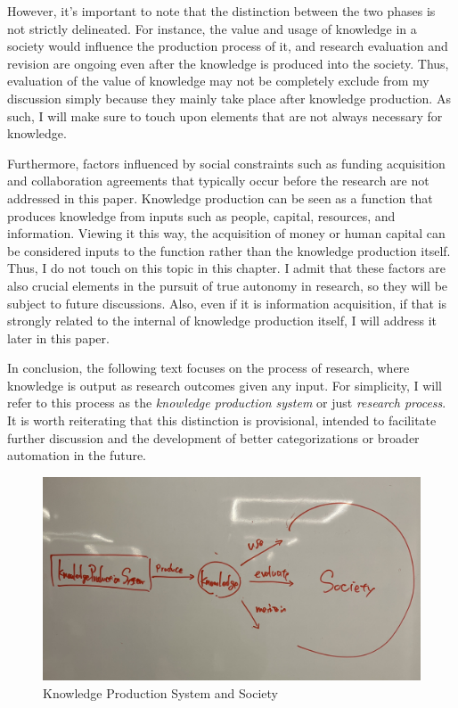 \documentclass{book}
\begin{document}
However, it's important to note that the distinction between the two phases is not strictly delineated. For instance, the value and usage of knowledge in a society would influence the production process of it, and research evaluation and revision are ongoing even after the knowledge is produced into the society. Thus, evaluation of the value of knowledge may not be completely exclude from my discussion simply because they mainly take place after knowledge production. As such, I will make sure to touch upon elements that are not always necessary for knowledge. 

Furthermore, factors influenced by social constraints such as funding acquisition and collaboration agreements that typically occur before the research are not addressed in this paper. Knowledge production can be seen as a function that produces knowledge from inputs such as people, capital, resources, and information. Viewing it this way, the acquisition of money or human capital can be considered inputs to the function rather than the knowledge production itself. Thus, I do not touch on this topic in this chapter. I admit that these factors are also crucial elements in the pursuit of true autonomy in research, so they will be subject to future discussions. Also, even if it is information acquisition, if that is strongly related to the internal of knowledge production itself, I will address it later in this paper. 

In conclusion, the following text focuses on the process of research, where knowledge is output as research outcomes given any input. For simplicity, I will refer to this process as the \textit{knowledge production system} or just \textit{research process}. It is worth reiterating that this distinction is provisional, intended to facilitate further discussion and the development of better categorizations or broader automation in the future.

\begin{figure}[htb]
    \centering
    \includegraphics[width=\linewidth]{figs/research_process_society.jpg}
    \caption{Knowledge Production System and Society}
    \label{fig:research_process_society}
\end{figure}
\end{document}
